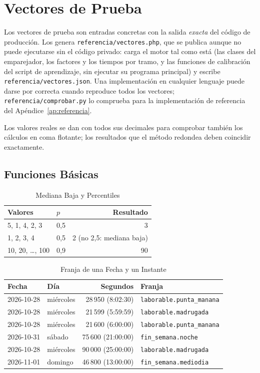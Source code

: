 \chapter{Vectores de Prueba}
\label{ap:vectores}

Los vectores de prueba son entradas concretas con la salida \emph{exacta} del código de producción. Los genera
\texttt{referencia/vectores.php}, que se publica aunque no puede ejecutarse sin el código privado: carga el motor tal
como está (las clases del emparejador, los factores y los tiempos por tramo, y las funciones de calibración del script
de aprendizaje, sin ejecutar su programa principal) y escribe \texttt{referencia/vectores.json}. Una implementación
en cualquier lenguaje puede darse por correcta cuando reproduce todos los vectores; \texttt{referencia/comprobar.py} lo comprueba para la implementación de referencia del
Apéndice~\ref{ap:referencia}.

Los valores reales se dan con todos sus decimales para comprobar también los cálculos en coma flotante; los
resultados que el método redondea deben coincidir exactamente.

\section{Funciones Básicas}

\begin{table}[ht]
\centering
\caption{Mediana Baja y Percentiles}\label{tab:v-percentil}
\begin{tabular}{@{}llr@{}}
\toprule
Valores & $p$ & Resultado\\
\midrule
5, 1, 4, 2, 3 & 0,5 & 3\\
1, 2, 3, 4 & 0,5 & 2 \quad(no 2,5: mediana baja)\\
10, 20, \dots, 100 & 0,9 & 90\\
\bottomrule
\end{tabular}
\end{table}

\begin{table}[ht]
\centering
\caption{Franja de una Fecha y un Instante}\label{tab:v-franja}
\begin{tabular}{@{}llrl@{}}
\toprule
Fecha & Día & Segundos & Franja\\
\midrule
2026-10-28 & miércoles & 28\,950 (8:02:30) & \texttt{laborable.punta\_manana}\\
2026-10-28 & miércoles & 21\,599 (5:59:59) & \texttt{laborable.madrugada}\\
2026-10-28 & miércoles & 21\,600 (6:00:00) & \texttt{laborable.punta\_manana}\\
2026-10-31 & sábado & 75\,600 (21:00:00) & \texttt{fin\_semana.noche}\\
2026-10-28 & miércoles & 90\,000 (25:00:00) & \texttt{laborable.madrugada}\\
2026-11-01 & domingo & 46\,800 (13:00:00) & \texttt{fin\_semana.mediodia}\\
\bottomrule
\end{tabular}
\end{table}

